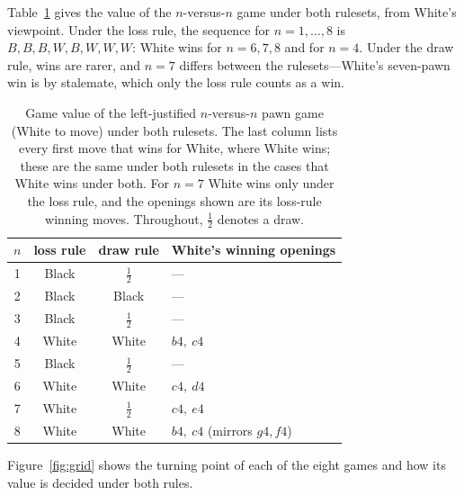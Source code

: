 \documentclass[Afour,sageapa,times]{sagej}
\theoremstyle{plain}
\theoremstyle{definition}
\newcommand{\resLoss}{$B,B,B,W,B,W,W,W$}
\newcommand{\nEightDrawResult}{White}
\begin{document}
Table~\ref{tab:results} gives the value of the $n$-versus-$n$ game under both
rulesets, from White's viewpoint. Under the loss rule, the sequence for
$n=1,\dots,8$ is \resLoss: White wins for $n=6,7,8$ and for $n=4$. Under the
draw rule, wins are rarer, and $n=7$ differs between the rulesets---White's
seven-pawn win is by stalemate, which only the loss rule counts as a win.

\begin{table}
\centering
\begin{tabular}{cccl}
\toprule
$n$ & loss rule & draw rule & White's winning openings \\
\midrule
1 & Black & $\tfrac12$ & --- \\
2 & Black & Black & --- \\
3 & Black & $\tfrac12$ & --- \\
4 & White & White & $b4,\ c4$ \\
5 & Black & $\tfrac12$ & --- \\
6 & White & White & $c4,\ d4$ \\
7 & White & $\tfrac12$ & $c4,\ e4$ \\
8 & White & \nEightDrawResult & $b4,\ c4$ (mirrors $g4,f4$) \\
\bottomrule
\end{tabular}
\caption{Game value of the left-justified $n$-versus-$n$ pawn game (White to
move) under both rulesets. The last column lists every first move that wins for
White, where White wins; these are the same under both rulesets in the cases that
White wins under both. For $n=7$ White wins only under the loss rule, and the
openings shown are its loss-rule winning moves. Throughout, $\tfrac12$ denotes a
draw.}
\label{tab:results}
\end{table}

Figure~\ref{fig:grid} shows the turning point of each of the eight games and how
its value is decided under both rules.
\end{document}
